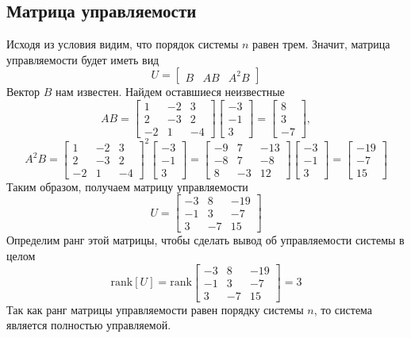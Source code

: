 \documentclass[a4paper, 12pt]{article}
\begin{document}
    \subsection{Матрица управляемости}
    Исходя из условия видим, что порядок системы $n$ равен трем. Значит, матрица управляемости будет иметь вид
    $$U=\begin{bmatrix}
        B &AB &A^2B
    \end{bmatrix}$$
    Вектор $B$ нам известен. Найдем оставшиеся неизвестные
    $$AB=\begin{bmatrix}
        1 &-2 &3\\
        2 &-3 &2\\
        -2 &1 &-4
    \end{bmatrix}\begin{bmatrix}
        -3\\
        -1\\
        3
    \end{bmatrix}=\begin{bmatrix}
        8\\
        3\\
        -7
    \end{bmatrix},$$
    $$A^2B=\begin{bmatrix}
        1 &-2 &3\\
        2 &-3 &2\\
        -2 &1 &-4
    \end{bmatrix}^2\begin{bmatrix}
        -3\\
        -1\\
        3
    \end{bmatrix}=\begin{bmatrix}
    -9	 &7	&-13\\
    -8	 &7	 &-8\\
    8	&-3	 &12
    \end{bmatrix}\begin{bmatrix}
        -3\\
        -1\\
        3
    \end{bmatrix}=\begin{bmatrix}  
    -19\\
    -7\\
    15
    \end{bmatrix}$$
    Таким образом, получаем матрицу управляемости
    $$
    U=\begin{bmatrix}
        -3 &8 &-19\\
        -1 &3 &-7\\
        3 &-7 &15
    \end{bmatrix}
    $$
    Определим ранг этой матрицы, чтобы сделать вывод об управляемости системы в целом
    $$
    \text{rank}\left[U\right]=\text{rank}\begin{bmatrix}
        -3 &8 &-19\\
        -1 &3 &-7\\
        3 &-7 &15
    \end{bmatrix}=3
    $$
    Так как ранг матрицы управляемости равен порядку системы $n$, то система является полностью управляемой.
\end{document}
